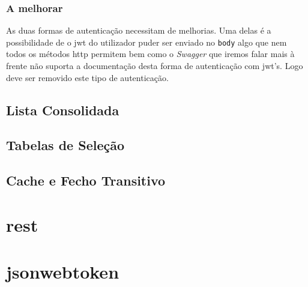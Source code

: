 \subsubsection{A melhorar}

As duas formas de autenticação necessitam de melhorias. Uma delas é a possibilidade de o \acrshort{jwt} do utilizador puder ser enviado no \texttt{body} algo que nem todos os métodos \acrshort{http} permitem bem como o \textit{Swagger} que iremos falar mais à frente não suporta a documentação desta forma de autenticação com \acrshort{jwt}'s. Logo deve ser removido este tipo de autenticação.

\subsection{Lista Consolidada}

\subsection{Tabelas de Seleção}

\subsection{Cache e Fecho Transitivo}

\section{\acrshort{rest}}
\cite{restws}



\section{jsonwebtoken}


